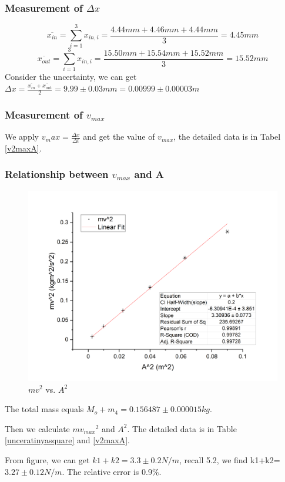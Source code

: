 \documentclass[12pt,a4paper]{article}
\begin{document}
\subsubsection{Measurement of $\Delta x$}
$$\overline{x_{in}}=\sum^3_{i=1}x_{in,i}=\frac{4.44mm+4.46mm+4.44mm}{3}=4.45mm$$
$$\overline{x_{out}}=\sum^3_{i=1}x_{in,i}=\frac{15.50mm+15.54mm+15.52mm}{3}=15.52mm$$
Consider the uncertainty, we can get $\Delta x=\frac{\overline{x_{in}}+\overline{x_{out}}}{2}=9.99\pm0.03mm=0.00999\pm0.00003m$

\subsubsection{Measurement of $v_{max}$}
We apply $v_max=\frac{\Delta x}{\Delta t}$ and get the value of $v_{max}$, the detailed data is in Tabel \ref{v2maxA}.

\subsubsection{Relationship between $v_{max}$ and A}

\begin{figure}[H]
    \centering
    \includegraphics[scale=0.32]{mvsquare.png}
    \caption{$mv^2$ vs. $A^2$}
    \label{mva}
\end{figure}

The total mass equals $M_o+m_4=0.156487\pm0.000015kg$. \par
Then we calculate $m{v_{max}}^2$ and $A^2$. The detailed data is in Table \ref{unceratinyasquare} and \ref{v2maxA}.\par 
From figure, we can get $k1+k2=3.3\pm0.2N/m$, recall 5.2, we find k1+k2=$3.27\pm 0.12N/m$. The relative error is 0.9\%.
\end{document}
